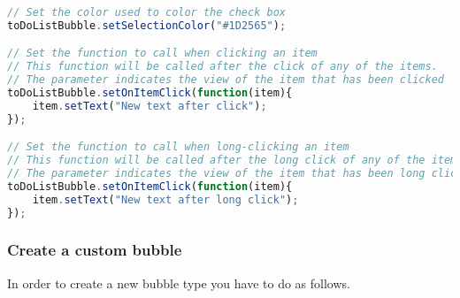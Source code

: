 \begin{lstlisting}[language=JavaScript]
// Set the color used to color the check box
toDoListBubble.setSelectionColor("#1D2565");

// Set the function to call when clicking an item
// This function will be called after the click of any of the items.
// The parameter indicates the view of the item that has been clicked
toDoListBubble.setOnItemClick(function(item){
    item.setText("New text after click");
});

// Set the function to call when long-clicking an item
// This function will be called after the long click of any of the items.
// The parameter indicates the view of the item that has been long clicked
toDoListBubble.setOnItemClick(function(item){
    item.setText("New text after long click");
});

\end{lstlisting}

\newpage
\subsubsection{Create a custom bubble}
In order to create a new bubble type you have to do as follows.

